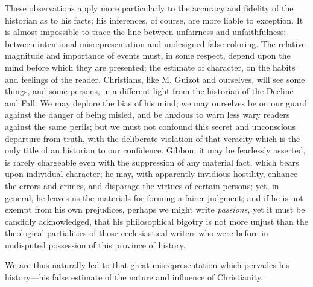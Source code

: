These observations apply more particularly to the accuracy and fidelity of the historian as to his facts; his inferences, of course, are more liable to exception. It is almost impossible to trace the line between unfairness and unfaithfulness; between intentional misrepresentation and undesigned false coloring. The relative magnitude and importance of events must, in some respect, depend upon the mind before which they are presented; the estimate of character, on the habits and feelings of the reader. Christians, like M. Guizot and ourselves, will see some things, and some persons, in a different light from the historian of the Decline and Fall. We may deplore the bias of his mind; we may ourselves be on our guard against the danger of being misled, and be anxious to warn less wary readers against the same perils; but we must not confound this secret and unconscious departure from truth, with the deliberate violation of that veracity which is the only title of an historian to our confidence. Gibbon, it may be fearlessly asserted, is rarely chargeable even with the suppression of any material fact, which bears upon individual character; he may, with apparently invidious hostility, enhance the errors and crimes, and disparage the virtues of certain persons; yet, in general, he leaves us the materials for forming a fairer judgment; and if he is not exempt from his own prejudices, perhaps we might write \textit{passions}, yet it must be candidly acknowledged, that his philosophical bigotry is not more unjust than the theological partialities of those ecclesiastical writers who were before in undisputed possession of this province of history.

We are thus naturally led to that great misrepresentation which pervades his history—his false estimate of the nature and influence of Christianity.


